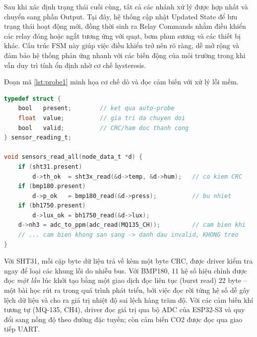 Sau khi xác định trạng thái cuối cùng, tất cả các nhánh xử lý được hợp nhất và chuyển sang phần Output. Tại đây, hệ thống cập nhật Updated State để lưu trạng thái hoạt động mới, đồng thời sinh ra Relay Commands nhằm điều khiển các relay đóng hoặc ngắt tương ứng với quạt, bơm phun sương và các thiết bị khác. Cấu trúc FSM này giúp việc điều khiển trở nên rõ ràng, dễ mở rộng và đảm bảo hệ thống phản ứng nhanh với các biến động của môi trường trong khi vẫn duy trì tính ổn định nhờ cơ chế hysteresis.

Đoạn mã \ref{lst:probe1} minh họa cơ chế dò và đọc cảm biến với xử lý lỗi mềm. 
\begin{lstlisting}[language=C, caption={Cơ chế dò và đọc cảm biến với xử lý lỗi mềm}, label={lst:probe1}]
typedef struct {
    bool   present;        // ket qua auto-probe
    float  value;          // gia tri da chuyen doi
    bool   valid;          // CRC/ham doc thanh cong
} sensor_reading_t;

void sensors_read_all(node_data_t *d) {
    if (sht31.present)
        d->th_ok  = sht3x_read(&d->temp, &d->hum);   // co kiem CRC
    if (bmp180.present)
        d->p_ok   = bmp180_read(&d->press);          // bu nhiet
    if (bh1750.present)
        d->lux_ok = bh1750_read(&d->lux);
    d->nh3 = adc_to_ppm(adc_read(MQ135_CH));         // cam bien khi
    // ... cam bien khong san sang -> danh dau invalid, KHONG treo
}
\end{lstlisting}
Với SHT31, mỗi cặp byte dữ liệu trả về kèm một byte CRC, được driver kiểm tra ngay để loại các khung lỗi do nhiễu bus. Với BMP180, 11 hệ số hiệu chỉnh được đọc \emph{một lần} lúc khởi tạo bằng một giao dịch đọc liên tục (burst read) 22 byte -- một bài học rút ra trong quá trình phát triển, bởi việc đọc rời từng hệ số dễ gây lệch dữ liệu và cho ra giá trị nhiệt độ sai lệch hàng trăm độ. Với các cảm biến khí tương tự (MQ-135, CH4), driver đọc giá trị qua bộ ADC của ESP32-S3 và quy đổi sang nồng độ theo đường đặc tuyến; còn cảm biến CO2 được đọc qua giao tiếp UART. 



